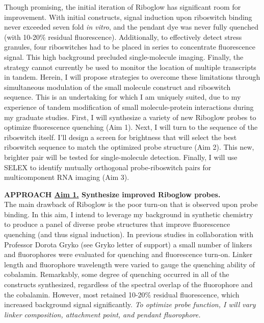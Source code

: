 Though promising, the initial iteration of Riboglow has significant room for improvement. With initial constructs, signal induction upon riboswitch binding never exceeded seven fold \textit{in vitro}, and the pendant dye was never fully quenched (with 10-20\% residual fluorescence). Additionally, to effectively detect stress granules, four riboswitches had to be placed in series to concentrate fluorescence signal. This high background precluded single-molecule imaging. Finally, the strategy cannot currently be used to monitor the location of multiple transcripts in tandem. Herein, I will propose strategies to overcome these limitations through simultaneous modulation of the small molecule construct and riboswitch sequence. This is an undertaking for which I am uniquely suited, due to my experience of tandem modification of small molecule-protein interactions during my graduate studies. First, I will synthesize a variety of new Riboglow probes to optimize fluorescence quenching (Aim 1). Next, I will turn to the sequence of the riboswitch itself. I'll design a screen for brightness that will select the best riboswitch sequence to match the optimized probe structure (Aim 2). This new, brighter pair will be tested for single-molecule detection. Finally, I will use SELEX to identify mutually orthogonal probe-riboswitch pairs for multicomponent RNA imaging (Aim 3).

\textbf{APPROACH \underline{Aim 1.} Synthesize improved Riboglow probes.}\\
The main drawback of Riboglow is the poor turn-on that is observed upon probe binding. In this aim, I intend to leverage my background in synthetic chemistry to produce a panel of diverse probe structures that improve fluorescence quenching (and thus signal induction). In previous studies in collaboration with Professor Dorota Gryko (see Gryko letter of support) a small number of linkers and fluorophores were evaluated for quenching and fluorescence turn-on. Linker length and fluorophore wavelength were varied to gauge the quenching ability of cobalamin. Remarkably, some degree of quenching occurred in all of the constructs synthesized, regardless of the spectral overlap of the fluorophore and the cobalamin. However, most retained 10-20\% residual fluorescence, which increased background signal significantly. \textit{To optimize probe function, I will vary linker composition, attachment point, and pendant fluorophore.}

